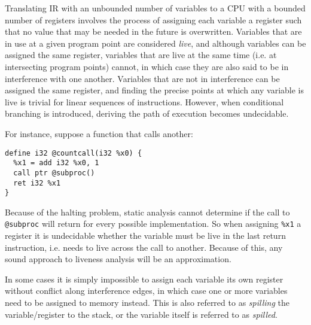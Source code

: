 \documentclass{article}
\begin{document}
Translating IR with an unbounded number of variables to a CPU with a bounded number of registers involves the process of assigning each variable a register such that no value that may be needed in the future is overwritten. %
Variables that are in use at a given program point are considered \textit{live}, and although variables can be assigned the same register, %
variables that are live at the same time (i.e. at intersecting program points) cannot, in which case they are also said to be in interference with one another.
 Variables that are not in interference can be assigned the same register, and finding the precise points at which any variable is live is trivial for linear sequences of instructions. However, when conditional branching is introduced, deriving the path of execution becomes undecidable. %

For instance, suppose a function that calls another:

\begin{verbatim}
define i32 @countcall(i32 %x0) {
  %x1 = add i32 %x0, 1
  call ptr @subproc()
  ret i32 %x1
}
\end{verbatim}
Because of the halting problem, static analysis cannot determine if the call to \lstinline!@subproc! will return for every possible implementation.  %
So when assigning \lstinline!%x1! a register it is undecidable whether the variable must be live in the last return instruction, i.e. needs to live across the call to another. Because of this, any sound approach to liveness analysis will be an approximation.

In some cases it is simply impossible to assign each variable its own register without conflict along interference edges, in which case one or more variables need to be assigned to memory instead. This is also referred to as \textit{spilling} the variable/register to the stack, or the variable itself is referred to as \textit{spilled}.

\end{document}

